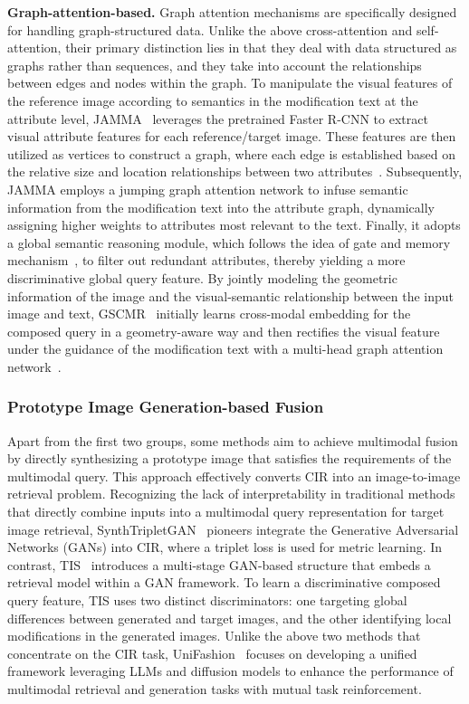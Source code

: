 \textbf{Graph-attention-based.} Graph attention mechanisms are specifically designed for handling graph-structured data. Unlike the above cross-attention and self-attention, their primary distinction lies in that they deal with data structured as graphs rather than sequences, and they take into account the relationships between edges and nodes within the graph. 
To manipulate the visual features of the reference image according to semantics in the modification text at the attribute level, JAMMA~\cite{zhang2020jamma} leverages the pretrained Faster R-CNN to extract visual attribute features for each reference/target image. These features are then utilized as vertices to construct a graph, where each edge is established based on the relative size and location relationships between two attributes~\cite{darec2019}. Subsequently, JAMMA employs a jumping graph attention network to infuse semantic information from the modification text into the attribute graph, dynamically assigning higher weights to attributes most relevant to the text. Finally, it adopts a global semantic reasoning module, which follows the idea of gate and memory mechanism~\cite{vscitm}, to filter out redundant attributes, thereby yielding a more discriminative global query feature. By jointly modeling the geometric information of the image and the visual-semantic relationship between the input image and text, GSCMR~\cite{zhang2021GSCMR} initially learns cross-modal embedding for the composed query in a geometry-aware way and then rectifies the visual feature under the guidance of the modification text with a multi-head graph attention network~\cite{2018graphattentionnetworks}. 

\subsubsection{Prototype Image Generation-based Fusion}
Apart from the first two groups, some methods aim to achieve multimodal fusion by directly synthesizing a prototype image that satisfies the requirements of the multimodal query. This approach effectively converts CIR into an image-to-image retrieval problem.
Recognizing the lack of interpretability in traditional methods that directly combine inputs into a multimodal query representation for target image retrieval, SynthTripletGAN~\cite{tautkute2021Synth} pioneers integrate the Generative Adversarial Networks (GANs) into CIR, where a triplet loss is used for metric learning. %
In contrast, TIS~\cite{zhang2022tis} introduces a multi-stage GAN-based structure that embeds a retrieval model within a GAN framework. To learn a discriminative composed query feature,
TIS uses two distinct discriminators: one targeting global differences between generated and target images, and the other identifying local modifications in the generated images. 
Unlike the above two methods that concentrate on the CIR task, UniFashion~\cite{zhao2024unifashion} focuses on developing a unified framework leveraging LLMs and diffusion models to enhance the performance of multimodal retrieval and generation tasks with mutual task reinforcement. 


